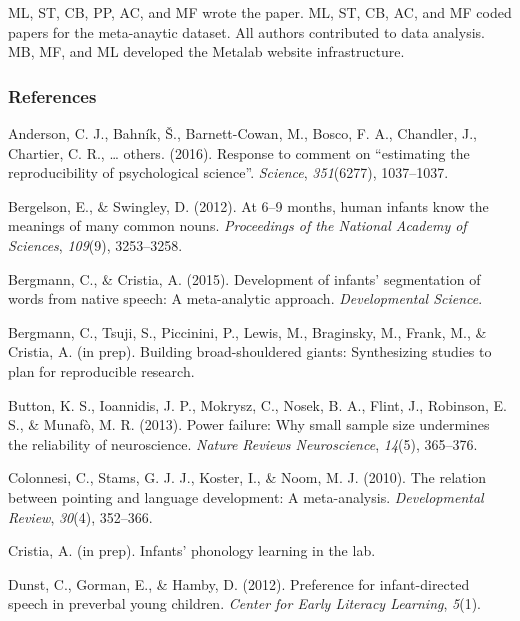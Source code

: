 \documentclass[english,floatsintext,man]{apa6}
\newcounter{author}
\begin{document}
ML, ST, CB, PP, AC, and MF wrote the paper. ML, ST, CB, AC, and MF coded
papers for the meta-anaytic dataset. All authors contributed to data
analysis. MB, MF, and ML developed the Metalab website infrastructure.

\newpage

\subsubsection{References}\label{references}

\setlength{\parindent}{-0.5in} \setlength{\leftskip}{0.5in}
\setlength{\parskip}{8pt}

\hypertarget{refs}{}
\hypertarget{ref-anderson2016response}{}
Anderson, C. J., Bahník, Š., Barnett-Cowan, M., Bosco, F. A., Chandler,
J., Chartier, C. R., \ldots{} others. (2016). Response to comment on
``estimating the reproducibility of psychological science''.
\emph{Science}, \emph{351}(6277), 1037--1037.

\hypertarget{ref-bergelson2016}{}
Bergelson, E., \& Swingley, D. (2012). At 6--9 months, human infants
know the meanings of many common nouns. \emph{Proceedings of the
National Academy of Sciences}, \emph{109}(9), 3253--3258.

\hypertarget{ref-bergmann2015development}{}
Bergmann, C., \& Cristia, A. (2015). Development of infants'
segmentation of words from native speech: A meta-analytic approach.
\emph{Developmental Science}.

\hypertarget{ref-bergmanneducational}{}
Bergmann, C., Tsuji, S., Piccinini, P., Lewis, M., Braginsky, M., Frank,
M., \& Cristia, A. (in prep). Building broad-shouldered giants:
Synthesizing studies to plan for reproducible research.

\hypertarget{ref-button2013power}{}
Button, K. S., Ioannidis, J. P., Mokrysz, C., Nosek, B. A., Flint, J.,
Robinson, E. S., \& Munafò, M. R. (2013). Power failure: Why small
sample size undermines the reliability of neuroscience. \emph{Nature
Reviews Neuroscience}, \emph{14}(5), 365--376.

\hypertarget{ref-colonnesi2010relation}{}
Colonnesi, C., Stams, G. J. J., Koster, I., \& Noom, M. J. (2010). The
relation between pointing and language development: A meta-analysis.
\emph{Developmental Review}, \emph{30}(4), 352--366.

\hypertarget{ref-cristiastatisticalinprep}{}
Cristia, A. (in prep). Infants' phonology learning in the lab.

\hypertarget{ref-dunst2012preference}{}
Dunst, C., Gorman, E., \& Hamby, D. (2012). Preference for
infant-directed speech in preverbal young children. \emph{Center for
Early Literacy Learning}, \emph{5}(1).
\end{document}
